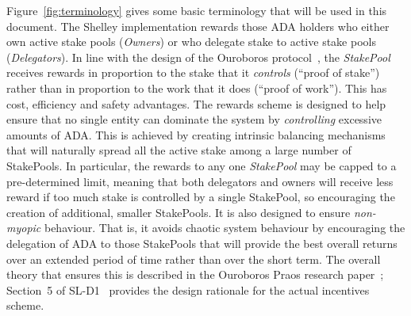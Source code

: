\documentclass[11pt,a4paper,dvipsnames,twosided,final]{article}
\newcommand{\ada}{ADA{}}
\begin{document}
Figure~\ref{fig:terminology} gives some basic terminology that will be used in this document.
The Shelley implementation rewards those \ada{} holders who either own active stake pools
(\emph{Owners}) or who delegate stake to active stake pools (\emph{Delegators}).
In line with the design of the Ouroboros protocol~\cite{ouroboros_classic}, the \emph{StakePool} receives
rewards in proportion to the stake that it \emph{controls} (``proof of
stake'') rather than in proportion to the work that it does (``proof of work'').
This has cost, efficiency and safety advantages.
The rewards scheme is designed to help ensure that no single entity can
dominate the system by \emph{controlling} excessive amounts of \ada{}.  This is achieved by creating intrinsic
balancing mechanisms that will naturally spread all the active stake among a large number of StakePools.
In particular, the rewards to any one \emph{StakePool} may be capped to a pre-determined limit,
meaning that both delegators and owners will receive less reward if too much stake is controlled by a single StakePool,
so encouraging the creation of additional, smaller StakePools.
It is also designed to ensure \emph{non-myopic} behaviour.  That is, it avoids chaotic system behaviour by encouraging the delegation of \ada{} to those StakePools that will provide
the best overall returns over an extended period of time rather than over the short term.
The overall theory that ensures this is described in the Ouroboros Praos research
paper~\cite{ouroboros_praos}; Section~5 of SL-D1~\cite{delegation_design} provides the design rationale
for the actual incentives scheme.
\end{document}
